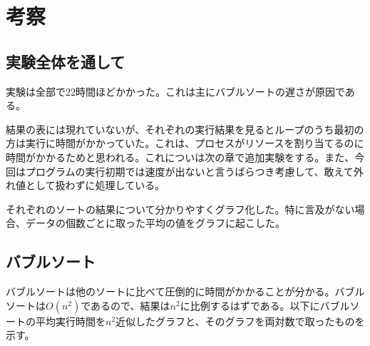 \documentclass[a4j,dvipdfmx]{jsreport}
\begin{document}
\section{考察}
\subsection{実験全体を通して}
実験は全部で22時間ほどかかった。これは主にバブルソートの遅さが原因である。\par
結果の表には現れていないが、それぞれの実行結果を見るとループのうち最初の方は実行に時間がかかっていた。これは、プロセスがリソースを割り当てるのに時間がかかるためと思われる。これについは次の章で追加実験をする。また、今回はプログラムの実行初期では速度が出ないと言うばらつき考慮して、敢えて外れ値として扱わずに処理している。\par
それぞれのソートの結果について分かりやすくグラフ化した。特に言及がない場合、データの個数ごとに取った平均の値をグラフに起こした。
\subsection{バブルソート}
バブルソートは他のソートに比べて圧倒的に時間がかかることが分かる。バブルソートは$O(n^2)$であるので、結果は$n^2$に比例するはずである。以下にバブルソートの平均実行時間を$n^2$近似したグラフと、そのグラフを両対数で取ったものを示す。
\end{document}
